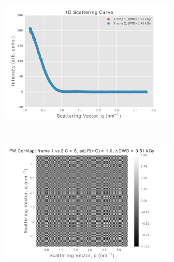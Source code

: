 \begin{figure}
    \centering
    \begin{subfigure}[b]{0.9\textwidth}
            \centering
            \includegraphics[width=\textwidth]{figures/saxs/scatter_curve_frames_1_2_amended.pdf}
            \caption{}
            \label{fig:1D scatter plot of frames 1 and 2}
    \end{subfigure}
    \\
    \begin{subfigure}[b]{0.9\textwidth}
            \centering
            \includegraphics[width=\textwidth]{figures/saxs/pwcormap_frames_1_2_amended.pdf}
            \caption{}
            \label{fig:Pairwise correlation frames 1 and 2}
    \end{subfigure}
\end{figure}
